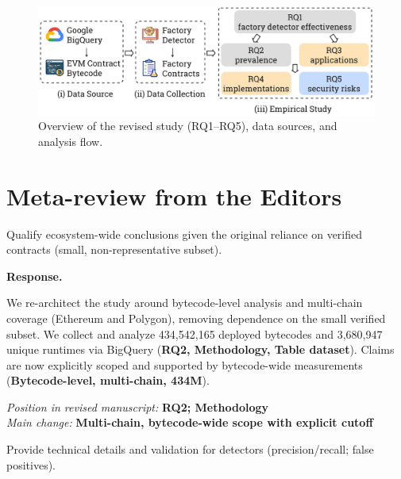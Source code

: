 \documentclass[acmsmall]{acmart}
\begin{document}
\vspace{0.5em}
\begin{figure}[t]
		\centering
		\includegraphics[width=0.9\linewidth]{figure/overview.pdf}
		\caption{Overview of the revised study (RQ1--RQ5), data sources, and analysis flow.}
		\label{fig:overview}
	\end{figure}

	\newpage

	\section*{Meta-review from the Editors}

	\begin{tcolorbox}
		[commentbox,title=Editor/AE -- Comment 1] Qualify ecosystem-wide conclusions given the
		original reliance on verified contracts (small, non-representative subset).
	\end{tcolorbox}

	\noindent
	\textbf{Response.}

	We re-architect the study around bytecode-level analysis and multi-chain coverage (Ethereum and Polygon),
	removing dependence on the small verified subset. We collect and analyze 434,542,165 deployed
	bytecodes and 3,680,947 unique runtimes via BigQuery ({\textbf{RQ2, Methodology, Table dataset}}).
	Claims are now explicitly scoped and supported by bytecode-wide measurements ({\textbf{Bytecode-level, multi-chain, 434M}}).

	\vspace{0.25em}
	\noindent
	\textit{Position in revised manuscript:} {\color{red}\textbf{RQ2; Methodology}}\\ \textit{Main
	change:} {\color{blue}\textbf{Multi-chain, bytecode-wide scope with explicit cutoff}}

	\begin{tcolorbox}
		[commentbox,title=Editor/AE -- Comment 2] Provide technical details and validation for
		detectors (precision/recall; false positives).
	\end{tcolorbox}
\end{document}
